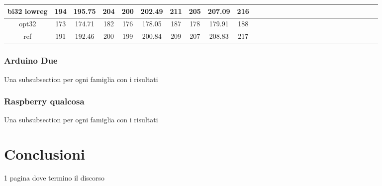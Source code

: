 \documentclass{report}
\begin{document}
\begin{landscape}
\begin{table}[]
\begin{adjustbox}{width=600pt}
\begin{tabular}{|c|c|c|c|c|c|c|c|c|c|c|c|c|c|c|c|c|c|c|c|c|c|c|c|c|c|c|c|}
				\hline
				bi32 lowreg & 194 & 195.75 & 204 & 200 & 202.49 & 211 & 205 & 207.09 & 216 & & & & & & & & & & & & & & & & & & \\
				\hline
				opt32 & 173 & 174.71 & 182 & 176 & 178.05 & 187 & 178 & 179.91 & 188 & & & & & & & & & & & & & & & & & & \\
				\hline
				ref & 191 & 192.46 & 200 & 199 & 200.84 & 209 & 207 & 208.83 & 217 & & & & & & & & & & & & & & & & & & \\
				\hline
			\end{tabular}
		\end{adjustbox}
	\end{table}
\end{landscape}

\subsection{Arduino Due}

Una subsubsection per ogni famiglia con i risultati

\subsection{Raspberry qualcosa}

Una subsubsection per ogni famiglia con i risultati

\newpage

\chapter{Conclusioni}

1 pagina dove termino il discorso

\newpage

\printbibliography
\end{document}
